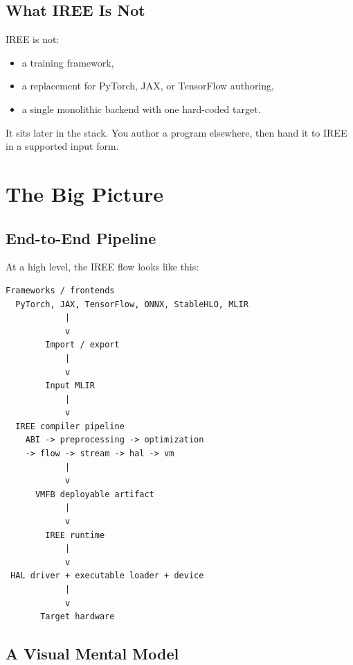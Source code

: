 \documentclass[11pt,a4paper]{article}
\begin{document}
\subsection{What IREE Is Not}

IREE is not:
\begin{itemize}
    \item a training framework,
    \item a replacement for PyTorch, JAX, or TensorFlow authoring,
    \item a single monolithic backend with one hard-coded target.
\end{itemize}

It sits later in the stack. You author a program elsewhere, then hand it to IREE in a supported input form.

\section{The Big Picture}

\subsection{End-to-End Pipeline}

At a high level, the IREE flow looks like this:

\begin{lstlisting}[caption=High-level IREE pipeline]
Frameworks / frontends
  PyTorch, JAX, TensorFlow, ONNX, StableHLO, MLIR
            |
            v
        Import / export
            |
            v
        Input MLIR
            |
            v
  IREE compiler pipeline
    ABI -> preprocessing -> optimization
    -> flow -> stream -> hal -> vm
            |
            v
      VMFB deployable artifact
            |
            v
        IREE runtime
            |
            v
 HAL driver + executable loader + device
            |
            v
       Target hardware
\end{lstlisting}

\subsection{A Visual Mental Model}
\end{document}
